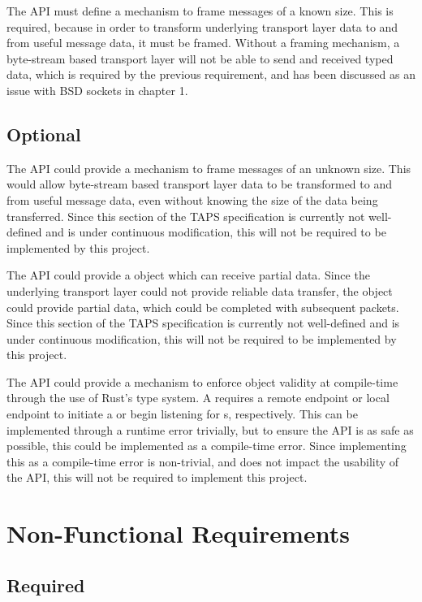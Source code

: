 The API must define a mechanism to frame messages of a known size.
This is required, because in order to transform underlying transport layer data to and from useful message data,
it must be framed.
Without a framing mechanism, a byte-stream based transport layer will not be able to send and received typed data,
which is required by the previous requirement, and has been discussed as an issue with BSD sockets in chapter 1.

\subsection{Optional}\label{subsec:optional}

The API could provide a mechanism to frame messages of an unknown size.
This would allow byte-stream based transport layer data to be transformed to and from useful message data, even without
knowing the size of the data being transferred.
Since this section of the TAPS specification is currently not well-defined and is under continuous modification,
this will not be required to be implemented by this project.

The API could provide a \connection{} object which can receive partial data.
Since the underlying transport layer could not provide reliable data transfer, the \connection{} object could provide
partial data, which could be completed with subsequent packets.
Since this section of the TAPS specification is currently not well-defined and is under continuous modification, this
will not be required to be implemented by this project.

The API could provide a mechanism to enforce \preconnection{} object validity at compile-time through the use of Rust's
type system.
A \preconnection{} requires a remote endpoint or local endpoint to initiate a \connection{} or begin listening for
\connection{}s, respectively.
This can be implemented through a runtime error trivially, but to ensure the API is as safe as possible, this could be
implemented as a compile-time error.
Since implementing this as a compile-time error is non-trivial, and does not impact the usability of the API, this will
not be required to implement this project.

\section{Non-Functional Requirements}\label{sec:non-functional-requirements}

\subsection{Required}\label{subsec:required2}


